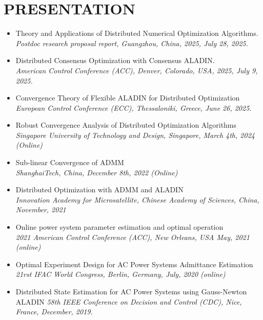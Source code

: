 \documentclass[paper=a4,fontsize=11pt]{scrartcl} %
\newcommand{\NewPart}[1]{\section*{\uppercase{#1}}}
\begin{document}
			\NewPart{PRESENTATION}{}
			\begin{itemize}
				\item  {
					{ Theory and Applications of Distributed Numerical Optimization Algorithms.}\\
					\emph{Postdoc research proposal report, Guangzhou,  China, 2025, July 28, 2025.
				} }
				
				\item  {
					{ Distributed Consensus Optimization with Consensus ALADIN.}\\
					\emph{American Control Conference (ACC), Denver, Colorado, USA, 2025, July 9, 2025.
				} }
				
				
				\item  {
					{ Convergence Theory of Flexible ALADIN for Distributed Optimization}\\
					\emph{European Control Conference (ECC), Thessaloniki, Greece, June 26, 2025.
				} }
				
				\item  {
					{Robust Convergence Analysis of Distributed Optimization Algorithms}\\
					\emph{Singapore University of Technology and Design, Singapore, March 4th, 2024 (Online)
				} }
				
				\item  {
					{Sub-linear Convergence of ADMM}\\
					\emph{ShanghaiTech, China, December 8th, 2022 (Online)
				} }
				
				\item  {
					{Distributed Optimization with ADMM and ALADIN}\\
					\emph{Innovation Academy for Microsatellite, Chinese Academy of Sciences, China,
						November, 2021
				} }
				
				\item  {
					{Online power system parameter estimation and optimal operation}\\
					\emph{2021 American Control Conference (ACC), New Orleans, USA May, 2021 (online)
				} }
				
				\item  {
					Optimal Experiment Design for AC Power Systems Admittance Estimation\\
					\emph{21rst IFAC World Congress, Berlin, Germany, July, 2020 (online)
				} }
				
				\item  {
					Distributed State Estimation for AC Power Systems using Gauss-Newton ALADIN 
					\emph{58th IEEE Conference on Decision and Control (CDC),
						Nice, France, December, 2019.} }
			\end{itemize}
			
\end{document}
